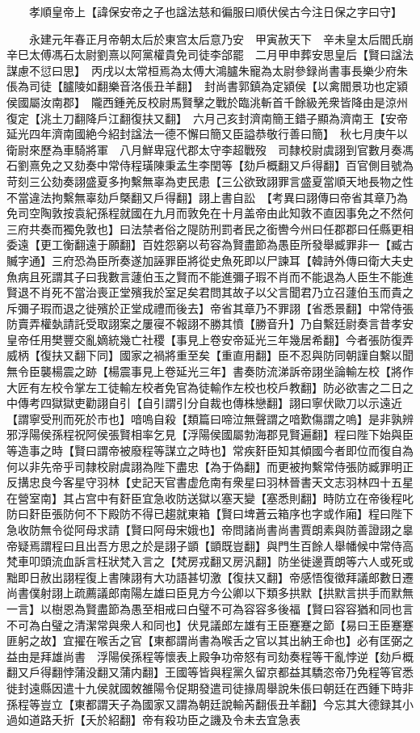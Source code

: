 　　孝順皇帝上【諱保安帝之子也諡法慈和徧服曰順伏侯古今注日保之字曰守】

　　永建元年春正月帝朝太后於東宫太后意乃安　甲寅赦天下　辛未皇太后閻氏崩　辛巳太傅馮石太尉劉熹以阿黨權貴免司徒李郃罷　二月甲申葬安思皇后【賢曰諡法謀慮不愆曰思】　丙戌以太常桓焉為太傅大鴻臚朱寵為太尉參録尚書事長樂少府朱倀為司徒【臚陵如翻樂音洛倀丑羊翻】　封尚書郭鎮為定潁侯【以禽閻景功也定潁侯國屬汝南郡】　隴西鍾羌反校尉馬賢擊之戰於臨洮斬首千餘級羌衆皆降由是涼州復定【洮土刀翻降戶江翻復扶又翻】　六月己亥封濟南簡王錯子顯為濟南王【安帝延光四年濟南國絶今紹封諡法一德不懈曰簡又臣謚恭敬行善曰簡】　秋七月庚午以衛尉來歷為車騎將軍　八月鮮卑寇代郡太守李超戰歿　司隸校尉虞詡到官數月奏馮石劉熹免之又劾奏中常侍程璜陳秉孟生李閏等【劾戶概翻又戶得翻】百官側目號為苛刻三公劾奏詡盛夏多拘繫無辜為吏民患【三公欲致詡罪言盛夏當順天地長物之性不當違法拘繫無辜劾戶槩翻又戶得翻】詡上書自訟　【考異曰詡傳曰帝省其章乃為免司空陶敦按袁紀孫程就國在九月而敦免在十月盖帝由此知敦不直因事免之不然何三府共奏而獨免敦也】曰法禁者俗之隄防刑罰者民之銜轡今州曰任郡郡曰任縣更相委遠【更工衡翻遠于願翻】百姓怨窮以苟容為賢盡節為愚臣所發舉臧罪非一【臧古贓字通】三府恐為臣所奏遂加誣罪臣將從史魚死即以尸諫耳【韓詩外傳曰衛大夫史魚病且死謂其子曰我數言蘧伯玉之賢而不能進彌子瑕不肖而不能退為人臣生不能進賢退不肖死不當治喪正堂殯我於室足矣君問其故子以父言聞君乃立召蘧伯玉而貴之斥彌子瑕而退之徙殯於正堂成禮而後去】帝省其章乃不罪詡【省悉景翻】中常侍張防賣弄權埶請託受取詡案之屢寑不報詡不勝其憤【勝音升】乃自繫廷尉奏言昔孝安皇帝任用樊豐交亂嫡統幾亡社稷【事見上卷安帝延光三年幾居希翻】今者張防復弄威柄【復扶又翻下同】國家之禍將重至矣【重直用翻】臣不忍與防同朝謹自繫以聞無令臣襲楊震之跡【楊震事見上卷延光三年】書奏防流涕訴帝詡坐論輸左校【將作大匠有左校令掌左工徒輸左校者免官為徒輸作左校也校戶教翻】防必欲害之二日之中傳考四獄獄吏勸詡自引【自引謂引分自裁也傳株戀翻】詡曰寧伏歐刀以示遠近【謂寧受刑而死於市也】喑嗚自殺【類篇曰啼泣無聲謂之喑歎傷謂之嗚】是非孰辨邪浮陽侯孫程祝阿侯張賢相率乞見【浮陽侯國屬勃海郡見賢遍翻】程曰陛下始與臣等造事之時【賢曰謂帝被廢程等謀立之時也】常疾姧臣知其傾國今者即位而復自為何以非先帝乎司隸校尉虞詡為陛下盡忠【為于偽翻】而更被拘繫常侍張防臧罪明正反搆忠良今客星守羽林【史記天官書虚危南有衆星曰羽林晉書天文志羽林四十五星在營室南】其占宫中有姧臣宜急收防送獄以塞天變【塞悉則翻】時防立在帝後程叱防曰姧臣張防何不下殿防不得已趨就東箱【賢曰埤蒼云箱序也字或作廂】程曰陛下急收防無令從阿母求請【賢曰阿母宋娥也】帝問諸尚書尚書賈朗素與防善證詡之辠帝疑焉謂程曰且出吾方思之於是詡子顗【顗既豈翻】與門生百餘人舉幡候中常侍高梵車叩頭流血訴言枉狀梵入言之【梵房戎翻又房汎翻】防坐徙邊賈朗等六人或死或黜即日赦出詡程復上書陳詡有大功語甚切激【復扶又翻】帝感悟復徵拜議郎數日遷尚書僕射詡上疏薦議郎南陽左雄曰臣見方今公卿以下類多拱默【拱默言拱手而默無一言】以樹恩為賢盡節為愚至相戒曰白璧不可為容容多後福【賢曰容容猶和同也言不可為白璧之清潔常與衆人和同也】伏見議郎左雄有王臣蹇蹇之節【易曰王臣蹇蹇匪躬之故】宜擢在喉舌之官【東都謂尚書為喉舌之官以其出納王命也】必有匡弼之益由是拜雄尚書　浮陽侯孫程等懷表上殿争功帝怒有司劾奏程等干亂悖逆【劾戶概翻又戶得翻悖蒲没翻又蒲内翻】王國等皆與程黨久留京都益其驕恣帝乃免程等官悉徙封遠縣因遣十九侯就國敇雒陽令促期發遣司徒掾周舉說朱倀曰朝廷在西鍾下時非孫程等豈立【東都謂天子為國家又謂為朝廷說輸芮翻倀丑羊翻】今忘其大德録其小過如道路夭折【夭於紹翻】帝有殺功臣之譏及令未去宜急表